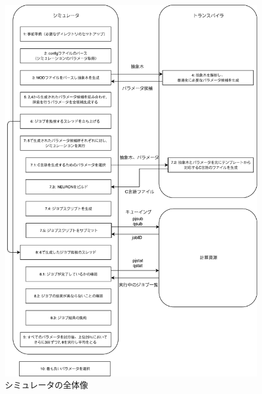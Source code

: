 \begin{figure}[h!]
 \begin{center}
    \includegraphics[width=1.1\textwidth]{./images/Genie.pdf}
    \caption{シミュレータの全体像}
    \label{fig:simulator-image}
 \end{center}
\end{figure}~\\

\clearpage

